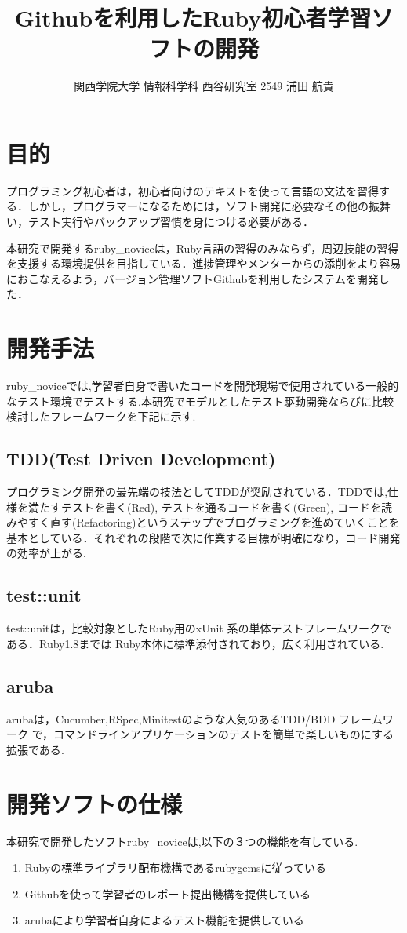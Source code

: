 \documentclass[10pt,a4j,twocolumn]{jsarticle}
\begin{document}
\title{Githubを利用したRuby初心者学習ソフトの開発}
\author{関西学院大学 情報科学科 西谷研究室 2549 浦田 航貴}
\date{}
\maketitle
\section{目的}
プログラミング初心者は，初心者向けのテキストを使って言語の文法を習得する．しかし，プログラマーになるためには，ソフト開発に必要なその他の振舞い，テスト実行やバックアップ習慣を身につける必要がある．

本研究で開発するruby\_noviceは，Ruby言語の習得のみならず，周辺技能の習得を支援する環境提供を目指している．進捗管理やメンターからの添削をより容易におこなえるよう，バージョン管理ソフトGithubを利用したシステムを開発した．

\section{開発手法}
ruby\_noviceでは,学習者自身で書いたコードを開発現場で使用されている一般的なテスト環境でテストする.本研究でモデルとしたテスト駆動開発ならびに比較検討したフレームワークを下記に示す.
\subsection{TDD(Test Driven Development)}
プログラミング開発の最先端の技法としてTDDが奨励されている．TDDでは,仕様を満たすテストを書く(Red), テストを通るコードを書く(Green), コードを読みやすく直す(Refactoring)というステップでプログラミングを進めていくことを基本としている．それぞれの段階で次に作業する目標が明確になり，コード開発の効率が上がる.
\subsection{test::unit}
test::unitは，比較対象としたRuby用のxUnit 系の単体テストフレームワークである．Ruby1.8までは Ruby本体に標準添付されており，広く利用されている.
\subsection{aruba}
arubaは，Cucumber,RSpec,Minitestのような人気のあるTDD/BDD フレームワーク
で，コマンドラインアプリケーションのテストを簡単で楽しいものにする拡張である\cite{aruba}.

\section{開発ソフトの仕様}
本研究で開発したソフトruby\_noviceは,以下の３つの機能を有している.
\begin{enumerate}
\item Rubyの標準ライブラリ配布機構であるrubygemsに従っている
\item Githubを使って学習者のレポート提出機構を提供している
\item arubaにより学習者自身によるテスト機能を提供している
\end{enumerate}
\end{document}
